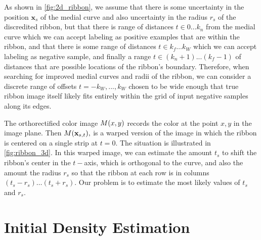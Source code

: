 As shown in \ref{fig:2d_ribbon}, we assume that there is some uncertainty in the position $\mathbf{x}_s$ of the medial curve and also uncertainty in the radius $r_s$ of the discredited ribbon, but that there is range of distances $t \in 0\dots k_n$ from the medial curve which we can accept labeling as positive examples that are within the ribbon, and that there is some range of distances $t \in k_f\dots k_W$ which we can accept labeling as negative sample, and finally a range $t\in (k_n+1)...(k_f-1)$ of distances that are possible locations of the ribbon's boundary.  Therefore, when searching for improved medial curves and radii of the ribbon, we can consider a discrete range of offsets $t=-k_W,..., k_W$ chosen to be wide enough that true ribbon image itself likely fits entirely within the grid of input negative samples along its edges.  

The orthorectified color image $M(x,y)$
records the color at the point $x,y$ in the image plane.
Then $M(\mathbf{x}_{s,t}),$ is a warped version of the image in which the ribbon is centered on a single strip at $t=0$.
The situation is illustrated in \ref{fig:ribbon_3d}.  
In this warped image, we can estimate the amount $t_s$ to shift the ribbon's center in the $t-$axis, which is orthogonal to the curve,  and also the amount the radius $r_s$ so that the  ribbon at each row is in columns $(t_s - r_s)\dots(t_s+r_s)$.  
Our problem is to estimate the most likely values of $t_s$ and $r_s$.  


\section{Initial Density Estimation}


